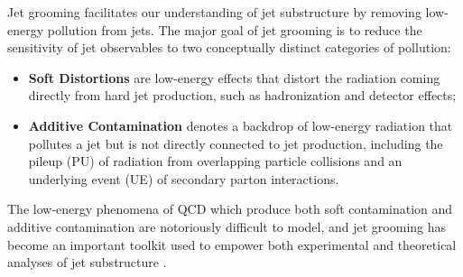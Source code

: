 \documentclass[letterpaper,11pt]{article}
\begin{document}
Jet grooming facilitates our understanding of jet substructure by removing low-energy pollution from jets.
%
The major goal of jet grooming is to reduce the sensitivity of jet observables to two conceptually distinct categories of pollution:
\begin{itemize}
    \item
    \textbf{Soft Distortions}
    are low-energy effects that distort the radiation coming directly from hard jet production, such as hadronization and detector effects;

    \item
    \textbf{Additive Contamination}
    denotes a backdrop of low-energy radiation that pollutes a jet but is not directly connected to jet production, including the pileup (PU) of radiation from overlapping particle collisions and an underlying event (UE) of secondary parton interactions.
\end{itemize}
The low-energy phenomena of QCD which produce both soft contamination and additive contamination are notoriously difficult to model, and jet grooming has become an important toolkit used to empower both experimental and theoretical analyses of jet substructure
\cite{Krohn:2009th,Ellis:2009me,Larkoski:2014wba,Dasgupta:2013ihk,Dasgupta:2013via,Tseng:2013dva,Dasgupta:2016ktv,Thaler:2008ju,Thaler:2011gf,Hook:2011cq,Gallicchio:2011xq,Soper:2012pb,Gallicchio:2012ez,CMS-PAS-JME-09-001,CMS-PAS-EXO-09-002,CMS:2013kfa,ATL-PHYS-PUB-2009-081,ATL-PHYS-PUB-2010-008,Cui:2010km,ATLAS-CONF-2011-053,Chatrchyan:2013rla,Larkoski:2013eya,Dasgupta:2012hg,Backovic:2013bga,ATLAS-CONF-2013-084,Komiske:2018vkc,Komiske:2016rsd,Metodiev:2018ftz,Krohn:2012fg,MERINO:2013tta,Bhattacherjee:2016bpy,Macaluso:2018tck,Egan:2017ojy,Kasieczka:2017nvn,Pearkes:2017hku,Butter:2017cot,Catani:1992ua,Dokshitzer:1998kz,Dasgupta:2001sh,Banfi:2004yd,Banfi:2005gj,Ellis:2009su,Banfi:2010pa,Walsh:2011fz,Chien:2012ur,Li:2012bw,Jouttenus:2013hs,Hatta:2013iba,Larkoski:2014tva,Procura:2018zpn,Aaboud:2017aca,Frye:2016aiz, Almeida:2008yp,Larkoski:2017iuy,Larkoski:2017cqq,Thaler:2010tr,Abdesselam:2010pt,Katz:2010mr,Gallicchio:2010dq,Adams:2015hiv,Sirunyan:2017ezt,Moore:2018lsr,FerreiradeLima:2016gcz,Rubin:2010fc,Chatrchyan:2012sn,ATLAS:2019kwg,CMS-PAS-BTV-13-001,CMS-PAS-JME-13-006,Kribs:2009yh,Chen:2010wk,Hackstein:2010wk,Kim:2010uj,Almeida:2011aa,Pandolfi:2012ima,Vernieri:2014wfa,CMS-PAS-HIG-17-007,Procura:2014cba,ATL-PHYS-PUB-2019-027,Aad:2019vyi,ATLAS:2020gwe}.
\end{document}
